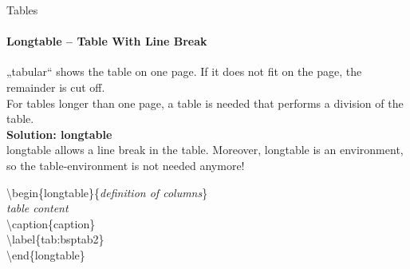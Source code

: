 \begin{frame}{Tables}
\framesubtitle{Longtable -- Table With Line Break}
\bigskip
„tabular“ shows the table on one page. If it does not fit on the page, the remainder is cut off.\\
For tables longer than one page, a table is needed that performs a division of the table.\\
\textbf{Solution: {\ttfamily longtable}}\\
{\ttfamily longtable} allows a line break in the table. Moreover, {\ttfamily longtable} is an environment, so the  {\ttfamily table}-environment is not needed anymore!\\[3mm]

\begin{ttfamily}
\color{unibablueI}\textbackslash begin\color{black}\{longtable\}\{\textit{definition of columns}\}\\
\textit{table content}\\
\color{nounibaredI}\textbackslash caption\color{black}\{caption\}\\
\color{nounibaredI}\textbackslash label\color{black}\{tab:bsptab2\}\\
\color{unibablueI}\textbackslash end\color{black}\{longtable\}
\end{ttfamily}
\end{frame}


